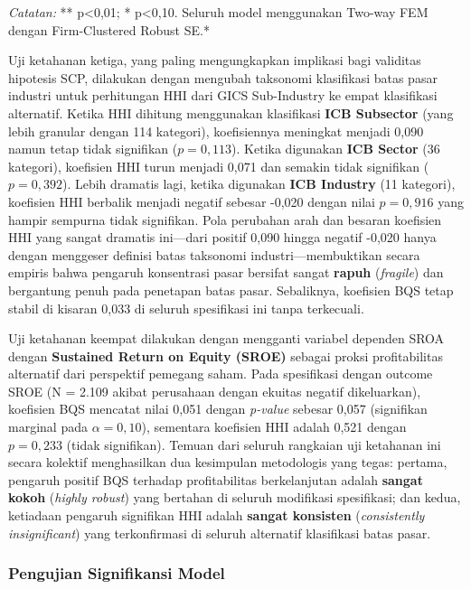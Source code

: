 \documentclass[12pt,a4paper]{article}
\begin{document}
\emph{Catatan: }** p\textless0,01; * p\textless0,10. Seluruh model
menggunakan Two-way FEM dengan Firm-Clustered Robust SE.*

Uji ketahanan ketiga, yang paling mengungkapkan implikasi bagi validitas
hipotesis SCP, dilakukan dengan mengubah taksonomi klasifikasi batas
pasar industri untuk perhitungan HHI dari GICS Sub-Industry ke empat
klasifikasi alternatif. Ketika HHI dihitung menggunakan klasifikasi
\textbf{ICB Subsector} (yang lebih granular dengan 114 kategori),
koefisiennya meningkat menjadi 0,090 namun tetap tidak signifikan
(\(p = 0{,}113\)). Ketika digunakan \textbf{ICB Sector} (36 kategori),
koefisien HHI turun menjadi 0,071 dan semakin tidak signifikan
(\(p = 0{,}392\)). Lebih dramatis lagi, ketika digunakan \textbf{ICB
Industry} (11 kategori), koefisien HHI berbalik menjadi negatif sebesar
-0,020 dengan nilai \(p = 0{,}916\) yang hampir sempurna tidak
signifikan. Pola perubahan arah dan besaran koefisien HHI yang sangat
dramatis ini---dari positif 0,090 hingga negatif -0,020 hanya dengan
menggeser definisi batas taksonomi industri---membuktikan secara empiris
bahwa pengaruh konsentrasi pasar bersifat sangat \textbf{rapuh}
(\emph{fragile}) dan bergantung penuh pada penetapan batas pasar.
Sebaliknya, koefisien BQS tetap stabil di kisaran 0,033 di seluruh
spesifikasi ini tanpa terkecuali.

Uji ketahanan keempat dilakukan dengan mengganti variabel dependen SROA
dengan \textbf{Sustained Return on Equity (SROE)} sebagai proksi
profitabilitas alternatif dari perspektif pemegang saham. Pada
spesifikasi dengan outcome SROE (N = 2.109 akibat perusahaan dengan
ekuitas negatif dikeluarkan), koefisien BQS mencatat nilai 0,051 dengan
\emph{p-value} sebesar 0,057 (signifikan marginal pada
\(\alpha = 0{,}10\)), sementara koefisien HHI adalah 0,521 dengan
\(p = 0{,}233\) (tidak signifikan). Temuan dari seluruh rangkaian uji
ketahanan ini secara kolektif menghasilkan dua kesimpulan metodologis
yang tegas: pertama, pengaruh positif BQS terhadap profitabilitas
berkelanjutan adalah \textbf{sangat kokoh} (\emph{highly robust}) yang
bertahan di seluruh modifikasi spesifikasi; dan kedua, ketiadaan
pengaruh signifikan HHI adalah \textbf{sangat konsisten}
(\emph{consistently insignificant}) yang terkonfirmasi di seluruh
alternatif klasifikasi batas pasar.

\subsubsection{Pengujian Signifikansi
Model}\label{pengujian-signifikansi-model-1}
\end{document}
